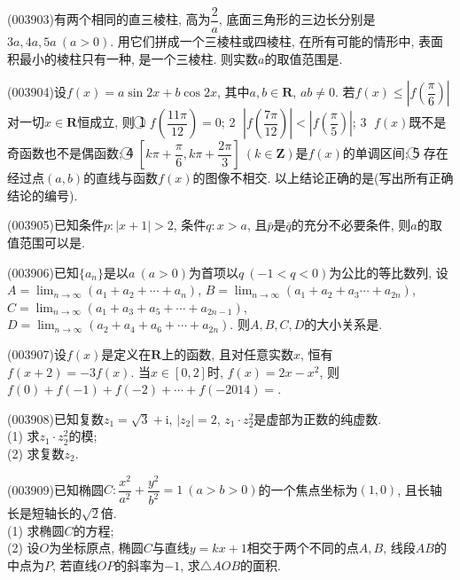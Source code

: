 \item (003903)有两个相同的直三棱柱, 高为$\dfrac 2a$, 底面三角形的三边长分别是$3a,4a,5a \ (a>0)$. 用它们拼成一个三棱柱或四棱柱, 在所有可能的情形中, 表面积最小的棱柱只有一种, 是一个三棱柱. 则实数$a$的取值范围是.
\item (003904)设$f(x)=a\sin 2x+b\cos 2x$, 其中$a,b\in \mathbf{R}$, $ab\ne 0$. 若$f(x)\le \left|f\left(\dfrac{\pi}{6}\right)\right|$对一切$x\in \mathbf{R}$恒成立, 则
\textcircled{1} $f\left(\dfrac{11\pi}{12}\right)=0$; \textcircled{2} $\left|f\left(\dfrac{7\pi}{12}\right)\right|<\left|f\left(\dfrac{\pi}{5}\right)\right|$; \textcircled{3} $f(x)$既不是奇函数也不是偶函数; \textcircled{4} $\left[k\pi+\dfrac{\pi}{6},k\pi+\dfrac{2\pi}{3}\right] \ (k\in \mathbf{Z})$是$f(x)$的单调区间; \textcircled{5} 存在经过点$(a,b)$的直线与函数$f(x)$的图像不相交. 
以上结论正确的是(写出所有正确结论的编号).
\item (003905)已知条件$p: |x+1|>2$, 条件$q: x>a$, 且$\bar{p}$是$\bar{q}$的充分不必要条件, 则$a$的取值范围可以是.
\item (003906)已知$\{a_n\}$是以$a \ (a>0)$为首项以$q \ (-1<q<0)$为公比的等比数列, 设$A=\displaystyle\lim_{n\to \infty}(a_1+a_2+\cdots+a_n)$, $B=\displaystyle\lim_{n\to \infty}(a_1+a_2+a_3\cdots+a_{2n})$, $C=\displaystyle\lim_{n\to \infty}(a_1+a_3+a_5+\cdots+a_{2n-1})$, $D=\displaystyle\lim_{n\to \infty}(a_2+a_4+a_6+\cdots+a_{2n})$. 则$A,B,C,D$的大小关系是.
\item (003907)设$f(x)$是定义在$\mathbf{R}$上的函数, 且对任意实数$x$, 恒有$f(x+2)=-3f(x)$. 当$x\in [0,2]$时, $f(x)=2x-x^2$, 则$f(0)+f(-1)+f(-2)+\cdots+f(-2014)=$.
\item (003908)已知复数$z_1=\sqrt{3}+\mathrm{i}$, $|z_2|=2$, $z_1\cdot z_2^2$是虚部为正数的纯虚数.\\
(1) 求$z_1\cdot z_2^2$的模;\\
(2) 求复数$z_2$.
\item (003909)已知椭圆$C:\dfrac{x^2}{a^2}+\dfrac{y^2}{b^2}=1 \ (a>b>0)$的一个焦点坐标为$(1,0)$, 且长轴长是短轴长的$\sqrt{2}$倍.\\
(1) 求椭圆$C$的方程;\\
(2) 设$O$为坐标原点, 椭圆$C$与直线$y=kx+1$相交于两个不同的点$A,B$, 线段$AB$的中点为$P$, 若直线$OP$的斜率为$-1$, 求$\triangle AOB$的面积.

